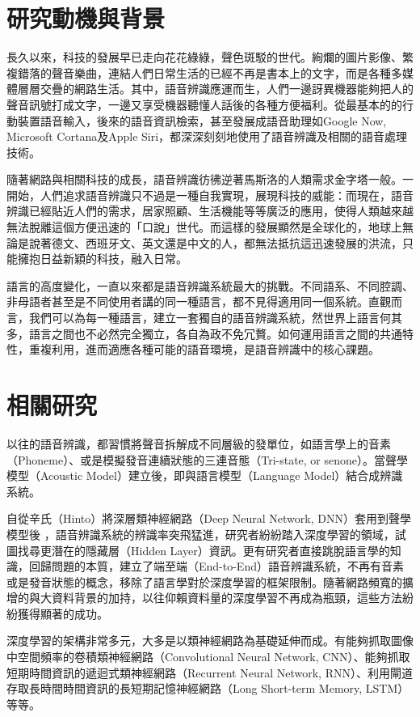 \section{研究動機與背景}

長久以來，科技的發展早已走向花花綠綠，聲色斑駁的世代。絢爛的圖片影像、繁複錯落的聲音樂曲，連結人們日常生活的已經不再是書本上的文字，而是各種多媒體層層交疊的網路生活。其中，語音辨識應運而生，人們一邊訝異機器能夠把人的聲音訊號打成文字，一邊又享受機器聽懂人話後的各種方便福利。從最基本的的行動裝置語音輸入，後來的語音資訊檢索，甚至發展成語音助理如Google Now, Microsoft Cortana及Apple Siri，都深深刻刻地使用了語音辨識及相關的語音處理技術。

隨著網路與相關科技的成長，語音辨識彷彿逆著馬斯洛的人類需求金字塔一般。一開始，人們追求語音辨識只不過是一種自我實現，展現科技的威能：而現在，語音辨識已經貼近人們的需求，居家照顧、生活機能等等廣泛的應用，使得人類越來越無法脫離這個方便迅速的「口說」世代。而這樣的發展顯然是全球化的，地球上無論是說著德文、西班牙文、英文還是中文的人，都無法抵抗這迅速發展的洪流，只能擁抱日益新穎的科技，融入日常。

語言的高度變化，一直以來都是語音辨識系統最大的挑戰。不同語系、不同腔調、非母語者甚至是不同使用者講的同一種語言，都不見得適用同一個系統。直觀而言，我們可以為每一種語言，建立一套獨自的語音辨識系統，然世界上語言何其多，語言之間也不必然完全獨立，各自為政不免冗贅。如何運用語言之間的共通特性，重複利用，進而適應各種可能的語音環境，是語音辨識中的核心課題。
\section{相關研究}
以往的語音辨識，都習慣將聲音拆解成不同層級的發單位，如語言學上的音素（Phoneme）、或是模擬發音連續狀態的三連音態（Tri-state, or senone）。當聲學模型（Acoustic Model）建立後，即與語言模型（Language Model）結合成辨識系統。
 
自從辛氏（Hinto）將深層類神經網路（Deep Neural Network, DNN）套用到聲學模型後\cite{hinton2012deep} \cite{dahl2013improving} \cite{nagamine2015exploring}，語音辨識系統的辨識率突飛猛進，研究者紛紛踏入深度學習的領域，試圖找尋更潛在的隱藏層（Hidden Layer）資訊。更有研究者直接跳脫語言學的知識，回歸問題的本質，建立了端至端（End-to-End）語音辨識系統\cite{graves2006connectionist}\cite{graves2013speech}，不再有音素或是發音狀態的概念，移除了語言學對於深度學習的框架限制。隨著網路頻寬的擴增的與大資料背景的加持，以往仰賴資料量的深度學習不再成為瓶頸，這些方法紛紛獲得顯著的成功。

深度學習的架構非常多元，大多是以類神經網路為基礎延伸而成。有能夠抓取圖像中空間頻率的卷積類神經網路\cite{lecun1995convolutional}\cite{jia2014caffe}（Convolutional Neural Network, CNN）、能夠抓取短期時間資訊的遞迴式類神經網路（Recurrent Neural Network, RNN）\cite{mikolov2010recurrent}、利用閘道存取長時間時間資訊的長短期記憶神經網路（Long Short-term Memory, LSTM）\cite{hochreiter1997long}等等。

